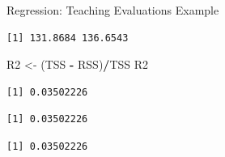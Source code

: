 \documentclass[
  ignorenonframetext,
]{beamer}
\newenvironment{Shaded}{\begin{snugshade}}{\end{snugshade}}
\newcommand{\CommentTok}[1]{\textcolor[rgb]{0.56,0.35,0.01}{\textit{#1}}}
\newcommand{\DecValTok}[1]{\textcolor[rgb]{0.00,0.00,0.81}{#1}}
\newcommand{\FunctionTok}[1]{\textcolor[rgb]{0.13,0.29,0.53}{\textbf{#1}}}
\newcommand{\NormalTok}[1]{#1}
\newcommand{\OtherTok}[1]{\textcolor[rgb]{0.56,0.35,0.01}{#1}}
\newcommand{\SpecialCharTok}[1]{\textcolor[rgb]{0.81,0.36,0.00}{\textbf{#1}}}
\begin{document}
\begin{frame}[fragile]{Regression: Teaching Evaluations Example}
\protect{}\label{regression-teaching-evaluations-example-14}
\normalsize

\begin{Shaded}
\end{Shaded}

\begin{verbatim}
[1] 131.8684 136.6543
\end{verbatim}

\begin{Shaded}
\begin{Highlighting}[]
\NormalTok{R2 }\OtherTok{\textless{}{-}}\NormalTok{ (TSS }\SpecialCharTok{{-}}\NormalTok{ RSS)}\SpecialCharTok{/}\NormalTok{TSS}
\NormalTok{R2}
\end{Highlighting}
\end{Shaded}

\begin{verbatim}
[1] 0.03502226
\end{verbatim}

\begin{Shaded}
\end{Shaded}

\begin{verbatim}
[1] 0.03502226
\end{verbatim}

\begin{Shaded}
\end{Shaded}

\begin{verbatim}
[1] 0.03502226
\end{verbatim}

\normalsize
\end{frame}
\end{document}
